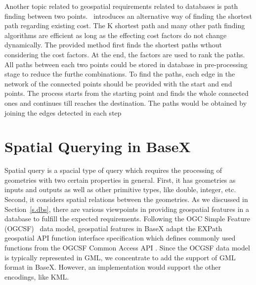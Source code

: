 \documentclass[a4paper,12pt]{article}
\begin{document}
Another topic related to geospatial requirements related to databases is path finding between two points.~\cite{} introduces an alternative way of finding the shortest path regarding existing cost. The K shortest path and many other path finding algorithms are efficient as long as the effecting cost factors do not change dynamically. The provided method first finds the shortest paths wthout considering the cost factors. At the end, the factors are used to rank the paths. All paths between each two points could be stored in database in pre-processing stage to reduce the furthe combinations. To find the paths, each edge in the network of the connected points should be provided with the start and end points. The process starts from the starting point and finds the whole connected ones and continues till reaches the destination. The paths would be obtained by joining the edges detected in each step
















\newpage
\section{Spatial Querying in BaseX}
\label{s.basex}
Spatial query is a spacial type of query which requires the processing of geometries with two certain properties in general. First, it has geometries as inputs and outputs as well as other primitive types, like double, integer, etc. Second, it considers spatial relations between the geometries.
As we discussed in Section~\ref{s.dbs}, there are various viewpoints in providing geospatial features in a database to fulfill the expected requirements. Following the OGC Simple Feature (OGCSF)~\cite{springergeo} data model, geospatial features in BaseX adapt the EXPath geospatial API function interface specification which defines commonly used functions from the OGCSF Common Access API \cite{simpleFeature}. Since the OCGSF data model is typically represented in GML, we concentrate to add the support of GML format in BaseX. However, an implementation would support the other encodings, like KML. 
\end{document}
